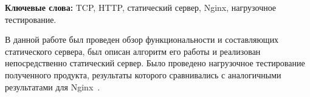 \begin{essay}{}

\textbf{Ключевые слова:} TCP, HTTP, статический сервер, Nginx, нагрузочное тестирование.

В данной работе был проведен обзор функциональности и составляющих статического сервера, был описан алгоритм его работы и реализован непосредственно статический сервер. Было проведено нагрузочное тестирование полученного продукта, результаты которого сравнивались с аналогичными результатами для Nginx~\cite{dejonghe2020nginx}.
\end{essay}